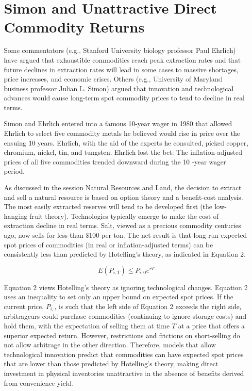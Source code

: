 \documentclass[11pt]{article}
\begin{document}
\section*{Simon and Unattractive Direct Commodity Returns}
Some commentators (e.g., Stanford University biology professor Paul Ehrlich) have argued that exhaustible commodities reach peak extraction rates and that future declines in extraction rates will lead in some cases to massive shortages, price increases, and economic crises. Others (e.g., University of Maryland business professor Julian L. Simon) argued that innovation and technological advances would cause long-term spot commodity prices to tend to decline in real terms.

Simon and Ehrlich entered into a famous 10-year wager in 1980 that allowed Ehrlich to select five commodity metals he believed would rise in price over the ensuing 10 years. Ehrlich, with the aid of the experts he consulted, picked copper, chromium, nickel, tin, and tungsten. Ehrlich lost the bet: The inflation-adjusted prices of all five commodities trended downward during the 10 -year wager period.

As discussed in the session Natural Resources and Land, the decision to extract and sell a natural resource is based on option theory and a benefit-cost analysis. The most easily extracted reserves will tend to be developed first (the low-hanging fruit theory). Technologies typically emerge to make the cost of extraction decline in real terms. Salt, viewed as a precious commodity centuries ago, now sells for less than $\$ 100$ per ton. The net result is that long-run expected spot prices of commodities (in real or inflation-adjusted terms) can be consistently less than predicted by Hotelling's theory, as indicated in Equation 2.


\begin{equation*}
E\left(P_{i, T}\right) \leq P_{i, 0} e^{r T} \tag{2}
\end{equation*}


Equation 2 views Hotelling's theory as ignoring technological changes. Equation 2 uses an inequality to set only an upper bound on expected spot prices. If the current price, $P_{i,}$, is such that the left side of Equation 2 exceeds the right side, arbitrageurs could purchase commodities (continuing to ignore storage costs) and hold them, with the expectation of selling them at time $T$ at a price that offers a superior expected return. However, restrictions and frictions on short-selling do not allow arbitrage in the other direction. Therefore, models that allow technological innovation predict that commodities can have expected spot prices that are lower than those predicted by Hotelling's theory, making direct investment in physical inventories unattractive in the absence of benefits derived from convenience yield.
\end{document}
